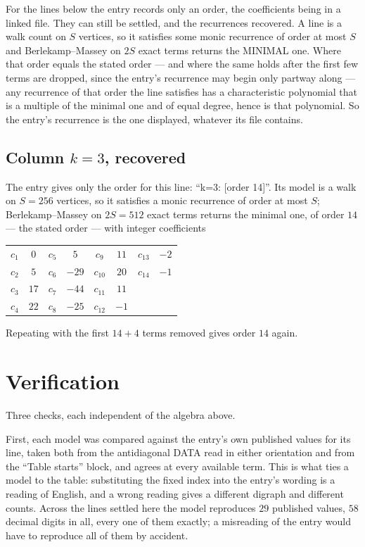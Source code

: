 \documentclass[11pt,a4paper]{article}
\theoremstyle{plain}
\theoremstyle{definition}
\begin{document}
For the lines below the entry records only an order, the coefficients being in a linked file.
They can still be settled, and the recurrences recovered. A line is a walk count on $S$
vertices, so it satisfies some monic recurrence of order at most $S$ and Berlekamp--Massey on
$2S$ exact terms returns the MINIMAL one. Where that order equals the stated order --- and
where the same holds after the first few terms are dropped, since the entry's recurrence may
begin only partway along --- any recurrence of that order the line satisfies has a
characteristic polynomial that is a multiple of the minimal one and of equal degree, hence is
that polynomial. So the entry's recurrence is the one displayed, whatever its file contains.

\subsection*{Column $k=3$, recovered}
The entry gives only the order for this line: ``k=3: [order 14]''. Its model is a walk on
$S=256$ vertices, so it satisfies a monic recurrence of order at most $S$;
Berlekamp--Massey on $2S=512$ exact terms returns the minimal one, of order
$14$ --- the stated order --- with integer coefficients
\begin{center}\small\begin{tabular}{cccccccc}
$c_{1}$ & $0$ & $c_{5}$ & $5$ & $c_{9}$ & $11$ & $c_{13}$ & $-2$ \\
$c_{2}$ & $5$ & $c_{6}$ & $-29$ & $c_{10}$ & $20$ & $c_{14}$ & $-1$ \\
$c_{3}$ & $17$ & $c_{7}$ & $-44$ & $c_{11}$ & $11$ &  &  \\
$c_{4}$ & $22$ & $c_{8}$ & $-25$ & $c_{12}$ & $-1$ &  &  \\
\end{tabular}\end{center}
Repeating with the first $14+4$ terms removed gives order $14$ again.

\section{Verification}

Three checks, each independent of the algebra above.

First, each model was compared against the entry's own published values for its line, taken
both from the antidiagonal DATA read in either orientation and from the ``Table starts''
block, and agrees at every available term. This is what ties a model to the table:
substituting the fixed index into the entry's wording is a reading of English, and a wrong
reading gives a different digraph and different counts. Across the lines settled here the
model reproduces $29$ published values, $58$ decimal digits in all, every one of
them exactly; a misreading of the entry would have to reproduce all of them by accident.
\end{document}
